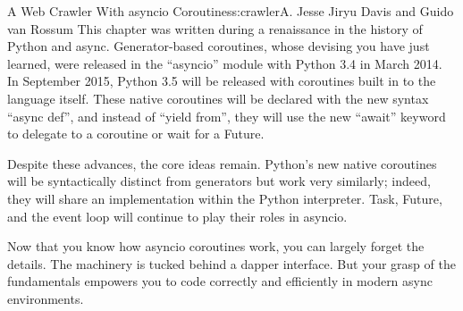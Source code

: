 \begin{aosachapter}{A Web Crawler With asyncio Coroutines}{s:crawler}{A. Jesse Jiryu Davis and Guido van Rossum}
This chapter was written during a renaissance in the history of Python
and async. Generator-based coroutines, whose devising you have just
learned, were released in the ``asyncio'' module with Python 3.4 in
March 2014. In September 2015, Python 3.5 will be released with
coroutines built in to the language itself. These native coroutines will
be declared with the new syntax ``async def'', and instead of ``yield
from'', they will use the new ``await'' keyword to delegate to a
coroutine or wait for a Future.

Despite these advances, the core ideas remain. Python's new native
coroutines will be syntactically distinct from generators but work very
similarly; indeed, they will share an implementation within the Python
interpreter. Task, Future, and the event loop will continue to play
their roles in asyncio.

Now that you know how asyncio coroutines work, you can largely forget
the details. The machinery is tucked behind a dapper interface. But your
grasp of the fundamentals empowers you to code correctly and efficiently
in modern async environments.

\end{aosachapter}

